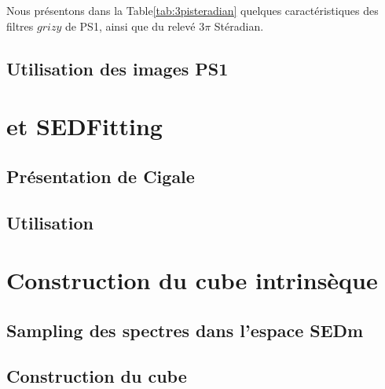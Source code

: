 \documentclass[../main/main.tex]{subfiles}
\begin{document}
Nous présentons dans la Table\ref{tab:3pisteradian} quelques
caractéristiques des filtres $grizy$ de PS1, ainsi que du relevé $3\pi$ Stéradian.
\subsection{Utilisation des images PS1}
\label{ssec:preprocessps1}


\section{ et SEDFitting}
\label{sec:cigale}

\subsection{Présentation de Cigale}
\label{ssec:cigale}

\subsection{Utilisation}
\label{ssec:usecigale}

\section{Construction du cube intrinsèque}

\subsection{Sampling des spectres dans l'espace SEDm}

\subsection{Construction du cube}

%
%
\end{document}
